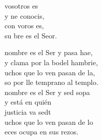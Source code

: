 \documentclass[12pt]{article}
\begin{document}
\begin{multicols*}{2}
\begin{cancion}%
	\begin{chorus}%
	 vosotros es \\
	y ne conocis,\\
	con voros es, \\
	su bre es el Seor.\\
	\end{chorus}%
	nombre es el Ser y pasa hae,\\
	y clama por la bodel hambrie,\\
	uchos que lo ven pasan de la,\\
	so por lle temprano al templo.\\
	nombre es el Ser y sed sopa\\
y está en quién \\
	justicia va sedt\\
	uchos que lo ven pasan de lo\\
	eces ocupa en sus rezos.\\
\end{cancion}%


\end{multicols*}
\end{document}
